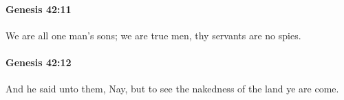 		\paragraph{Genesis 42:11} %
			\label{GENESIS-42-11}

			We are all one man's sons; we are true men, thy servants are no spies.


		\paragraph{Genesis 42:12} %
			\label{GENESIS-42-12}

			And he said unto them, Nay, but to see the nakedness of the land ye are come.


